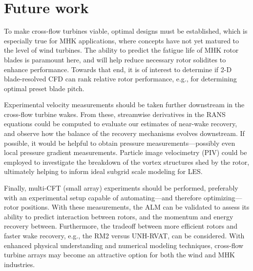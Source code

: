 \section{Future work}

To make cross-flow turbines viable, optimal designs must be established, which
is especially true for MHK applications, where concepts have not yet matured to
the level of wind turbines. The ability to predict the fatigue life of MHK rotor
blades is paramount here, and will help reduce necessary rotor solidites to
enhance performance. Towards that end, it is of interest to determine if 2-D
blade-resolved CFD can rank relative rotor performance, e.g., for determining
optimal preset blade pitch.

Experimental velocity measurements should be taken further downstream in the
cross-flow turbine wakes. From these, streamwise derivatives in the RANS
equations could be computed to evaluate our estimates of near-wake recovery, and
observe how the balance of the recovery mechanisms evolves downstream. If
possible, it would be helpful to obtain pressure measurements---possibly even
local pressure gradient measurements. Particle image velocimetry (PIV) could be
employed to investigate the breakdown of the vortex structures shed by the
rotor, ultimately helping to inform ideal subgrid scale modeling for LES.

Finally, multi-CFT (small array) experiments should be performed, preferably
with an experimental setup capable of automating---and therefore
optimizing---rotor positions. With these measurements, the ALM can be validated
to assess its ability to predict interaction between rotors, and the momentum
and energy recovery between. Furthermore, the tradeoff between more efficient
rotors and faster wake recovery, e.g., the RM2 versus UNH-RVAT, can be
considered. With enhanced physical understanding and numerical modeling
techniques, cross-flow turbine arrays may become an attractive option for both
the wind and MHK industries.
